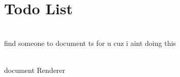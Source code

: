 \chapter{Todo List }
\hypertarget{todo}{}\label{todo}

\begin{DoxyRefList}
\item[{\parbox[t]{\linewidth}{Page \doxylink{resourceman}{Resource Management} }}]\hfill \\
\label{todo__todo000002}%
%
find someone to document ts for u cuz i aint doing this 
\item[{\parbox[t]{\linewidth}{Page \doxylink{renderer}{The Solaris Renderer} }}]\hfill \\
\label{todo__todo000001}%
%
document {\ttfamily Renderer}
\end{DoxyRefList}
